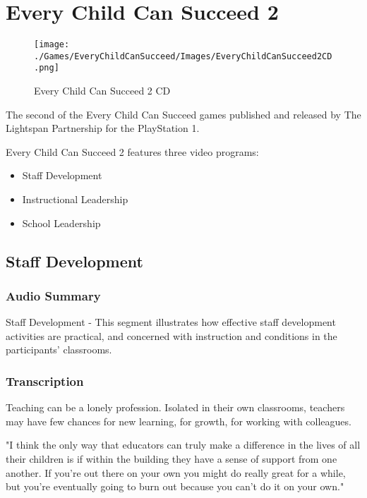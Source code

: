 \chapter{Every Child Can Succeed 2}

\begin{figure}[H]
    \centering
    \texttt{[image: ./Games/EveryChildCanSucceed/Images/EveryChildCanSucceed2CD.png]}
    \caption{Every Child Can Succeed 2 CD}
\end{figure}

The second of the Every Child Can Succeed games published and released by The Lightspan Partnership for the PlayStation 1.

Every Child Can Succeed 2 features three video programs:

\begin{itemize}
    \item Staff Development
    \item Instructional Leadership
    \item School Leadership
\end{itemize}

\clearpage
\newpage

\section{Staff Development}

\subsection{Audio Summary}

Staff Development - This segment illustrates how effective staff development activities are practical, and concerned with instruction and conditions in the participants' classrooms.

\subsection{Transcription}

Teaching can be a lonely profession. Isolated in their own classrooms, teachers may have few chances for new learning, for growth, for working with colleagues.

"I think the only way that educators can truly make a difference in the lives of all their children is if within the building they have a sense of support from one another. If you're out there on your own you might do really great for a while, but you're eventually going to burn out because you can't do it on your own."

